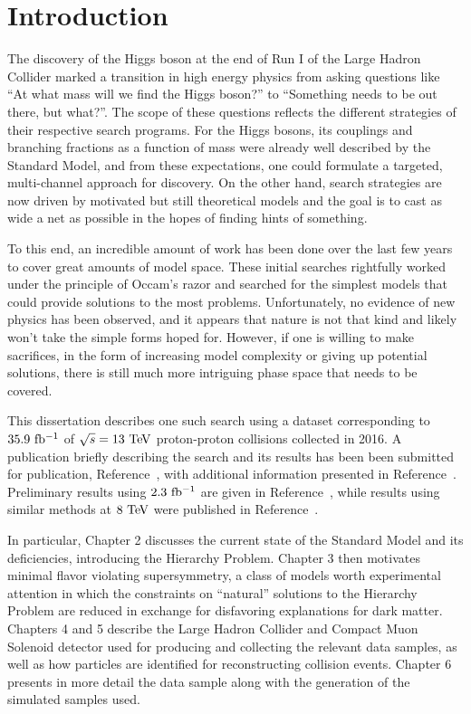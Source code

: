 \chapter{Introduction}

The discovery of the Higgs boson at the end of Run I of the Large Hadron Collider marked a transition in high energy physics from asking questions like ``At what mass will we find the Higgs boson?'' to ``Something needs to be out there, but what?''.
The scope of these questions reflects the different strategies of their respective search programs.
For the Higgs bosons, its couplings and branching fractions as a function of mass were already well described by the Standard Model, and from these expectations, one could formulate a targeted, multi-channel approach for discovery.
On the other hand, search strategies are now driven by motivated but still theoretical models and the goal is to cast as wide a net as possible in the hopes of finding hints of something.

To this end, an incredible amount of work has been done over the last few years to cover great amounts of model space.
These initial searches rightfully worked under the principle of Occam's razor and searched for the simplest models that could provide solutions to the most problems.
Unfortunately, no evidence of new physics has been observed, and it appears that nature is not that kind and likely won't take the simple forms hoped for.
However, if one is willing to make sacrifices, in the form of increasing model complexity or giving up potential solutions, there is still much more intriguing phase space that needs to be covered. 

This dissertation describes one such search using a dataset corresponding to $35.9~\mathrm{fb^{-1}}$ of $\sqrt{s} = 13~\mathrm{Te\kern -0.1em V}$ proton-proton collisions collected in 2016. 
A publication briefly describing the search and its results has been been submitted for publication, Reference~\cite{Sirunyan:2017dhe}, with additional information presented in Reference~\cite{SUS-16-040_supp}.
Preliminary results using $2.3~\mathrm{fb^{-1}}$ are given in Reference~\cite{CMS-PAS-SUS-16-013}, while results using similar methods at $8~\mathrm{Te\kern -0.1em V}$ were published in Reference~\cite{Khachatryan:2016iqn}.

In particular, Chapter 2 discusses the current state of the Standard Model and its deficiencies, introducing the Hierarchy Problem.
Chapter 3 then motivates minimal flavor violating supersymmetry, a class of models worth experimental attention in which the constraints on ``natural'' solutions to the Hierarchy Problem are reduced in exchange for disfavoring explanations for dark matter.
Chapters 4 and 5 describe the Large Hadron Collider and Compact Muon Solenoid detector used for producing and collecting the relevant data samples, as well as how particles are identified for reconstructing collision events.
Chapter 6 presents in more detail the data sample along with the generation of the simulated samples used.

